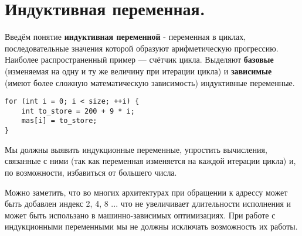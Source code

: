 \section{Индуктивная переменная.}

Введём понятие \textbf{индуктивная переменной} -  переменная в циклах, последовательные значения которой образуют арифметическую прогрессию. Наиболее распространенный пример — счётчик цикла. Выделяют \textbf{базовые} (изменяемая на одну и ту же величину при итерации цикла) и \textbf{зависимые} (имеют более сложную математическую зависимость) индуктивные переменные. 

\begin{verbatim}
for (int i = 0; i < size; ++i) {
    int to_store = 200 + 9 * i;
    mas[i] = to_store;
}
\end{verbatim}

Мы должны выявить индукционные переменные, упростить вычисления, связанные с ними (так как переменная изменяется на каждой итерации цикла) и, по возможности, избавиться от большего числа. 



Можно заметить, что во многих архитектурах при обращении к адрессу может быть добавлен индекс 2, 4, 8 ... что не увеличивает длительности исполнения и может быть использано в машинно-зависимых оптимизациях. При работе с индукционными переменными мы не должны исключать возможность их работы.



\newpage